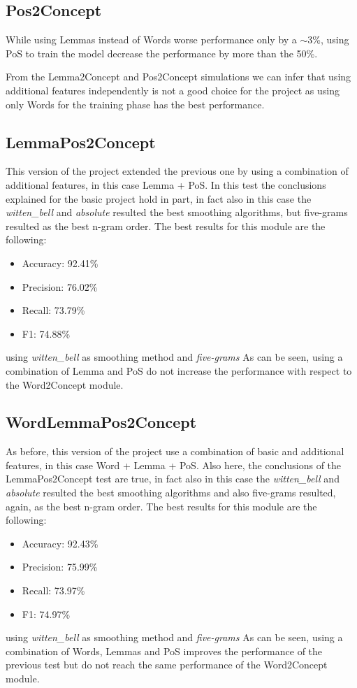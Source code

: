 \documentclass[11pt,a4paper]{article}
\begin{document}
\subsection{Pos2Concept}

While using Lemmas instead of Words worse performance only by a $\sim$3\%, using PoS to train the model decrease the performance by more than the 50\%.

From the Lemma2Concept and Pos2Concept simulations we can infer that using additional features independently is not a good choice for the project as using only Words for the training phase has the best performance.

\subsection{LemmaPos2Concept}
This version of the project extended the previous one by using a combination of additional features, in this case Lemma + PoS. In this test the conclusions explained for the
basic project hold in part, in fact also in this case the \textit{witten\_bell} and \textit{absolute} resulted the best smoothing algorithms, but five-grams resulted as the best n-gram order. The best results for this module are the following:
\begin{itemize}
    \item Accuracy: 92.41\%
    \item Precision: 76.02\%
    \item Recall:   73.79\%
    \item F1:   74.88\%
\end{itemize}
using \textit{witten\_bell} as smoothing method and \textit{five-grams}
As can be seen, using a combination of Lemma and PoS do not increase the performance with respect to the Word2Concept module.

\subsection{WordLemmaPos2Concept}
As before, this version of the project use a combination of basic and additional features, in this case Word + Lemma + PoS. Also here, the conclusions of the LemmaPos2Concept test are true, in fact also in this case the \textit{witten\_bell} and \textit{absolute} resulted the best smoothing algorithms and also five-grams resulted, again, as the best n-gram order. The best results for this module are the following:
\begin{itemize}
    \item Accuracy: 92.43\%
    \item Precision: 75.99\%
    \item Recall:   73.97\%
    \item F1:   74.97\%
\end{itemize}
using \textit{witten\_bell} as smoothing method and \textit{five-grams}
As can be seen, using a combination of Words, Lemmas and PoS improves the performance of the previous test but do not reach the same performance of the Word2Concept module.
\end{document}
